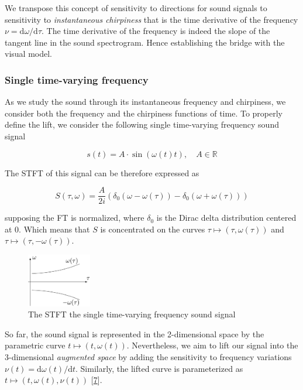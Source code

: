 \documentclass[
  american,
]{article}
\begin{document}
We transpose this concept of sensitivity to directions
for sound signals to sensitivity to \emph{instantaneous chirpiness}
that is the time derivative of the frequency \(\nu=\mathrm{d}\omega/\mathrm{d}\tau\).
The time derivative of the frequency is indeed the slope
of the tangent line in the sound spectrogram.
Hence establishing the bridge with the visual model.

\hypertarget{single-time-varying-frequency}{%
\subsubsection{Single time-varying frequency}\label{single-time-varying-frequency}}

As we study the sound through its instantaneous frequency and chirpiness,
we consider both the frequency and the chirpiness functions of time.
To properly define the lift, we consider the following single
time-varying frequency sound signal

\begin{equation}
s(t) = A\cdot\sin(\omega(t)t),\quad A\in\mathbb{R}
\end{equation}

The STFT of this signal can be therefore expressed as

\begin{equation}
S(\tau,\omega) = \frac{A}{2i}\left(\delta_0(\omega-\omega(\tau)) - \delta_0(\omega+\omega(\tau))\right)
\end{equation}

supposing the FT is normalized, where \(\delta_0\) is the Dirac delta
distribution centered at 0.
Which means that \(S\) is concentrated on the curves \(\tau\mapsto(\tau,\omega(\tau))\)
and \(\tau\mapsto(\tau,-\omega(\tau))\).

\begin{figure}
\centering
\includegraphics[width=0.25\textwidth,height=\textheight]{img/single_freq.png}
\caption{The STFT the single time-varying frequency sound signal}
\end{figure}

So far, the sound signal is represented in the 2-dimensional space
by the parametric curve \(t\mapsto(t,\omega(t))\).
Nevertheless, we aim to lift our signal into the 3-dimensional \emph{augmented space}
by adding the sensitivity to frequency variations \(\nu(t)=\mathrm{d}\omega(t)/\mathrm{d}t\).
Similarly, the lifted curve is parameterized as \(t\mapsto(t,\omega(t),\nu(t))\) {[}\protect\hyperlink{ref-boscain2021}{7}{]}.
\end{document}
